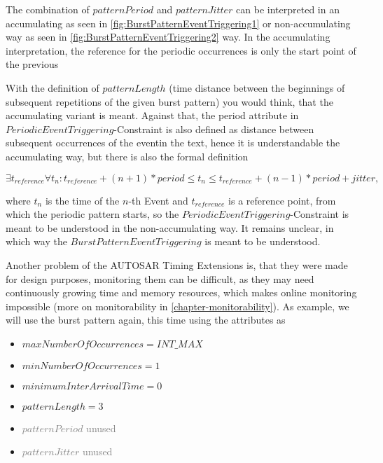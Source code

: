 The combination of $patternPeriod$ and $patternJitter$ can be interpreted in an accumulating as seen in \ref{fig:BurstPatternEventTriggering1} or non-accumulating way as seen in \ref{fig:BurstPatternEventTriggering2} way. In the accumulating interpretation, the reference for the periodic occurrences is only the start point of the previous 

With the definition of $patternLength$ (\glqq time distance between the beginnings of subsequent repetitions of the given burst pattern\grqq) you would think, that the accumulating variant is meant. Against that, the period attribute in $PeriodicEventTriggering$-Constraint is also defined as \glqq distance between subsequent occurrences of the event\grqq in the text, hence it is understandable the accumulating way, but there is also the formal definition

\begin{math}
\exists t_{reference}\forall t_n: t_{reference}+(n+1)*period\leq t_n\leq t_{reference}+(n-1)*period+jitter,
\end{math}

where $t_n$ is the time of the $n$-th Event and $t_{reference}$ is a reference point, from which the periodic pattern starts, so the $PeriodicEventTriggering$-Constraint is meant to be understood in the non-accumulating way. It remains unclear, in which way the $BurstPatternEventTriggering$ is meant to be understood.

Another problem of the AUTOSAR Timing Extensions is, that they were made for design purposes, monitoring them can be difficult, as they may need continuously growing time and memory resources, which makes online monitoring impossible (more on monitorability in \ref{chapter-monitorability}). As example, we will use the burst pattern again, this time using the attributes as
\begin{itemize}
	\item
	$maxNumberOfOccurrences = INT\_MAX$
	\item
	$minNumberOfOccurrences = 1$
	\item
	$minimumInterArrivalTime = 0$
	\item
	$patternLength = 3$
	\item
	\textcolor{gray}{$patternPeriod$} \textcolor{gray}{unused}
	\item
	\textcolor{gray}{$patternJitter$} \textcolor{gray}{unused}
\end{itemize}

